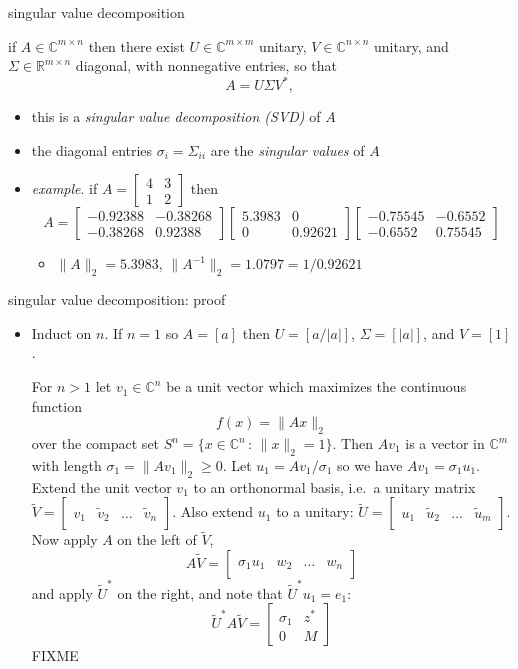 \documentclass[10pt,hyperref]{beamer}
\newcommand{\CC}{\mathbb{C}}
\newcommand{\RR}{\mathbb{R}}
\newcommand{\ds}{\displaystyle}
\newcommand{\trefmatrixthree}[3]{\left[\begin{array}{c|c|c|c} & & & \\ #1 & #2 & \dots & #3 \\ & & & \end{array}\right]}
\newcommand{\blocktwo}[4]{\left[\begin{array}{c|c} #1 & #2 \\ \hline #3 & #4 \end{array}\right]}
\begin{document}
\begin{frame}{singular value decomposition}

\begin{theorem}
 if $A\in \CC^{m\times n}$ then there exist $U\in \CC^{m\times m}$ unitary, $V \in \CC^{n\times n}$ unitary, and $\Sigma \in \RR^{m\times n}$ diagonal, with nonnegative entries, so that
    $$A = U \Sigma V^*,$$
\end{theorem}

\begin{itemize}
\item this is a \emph{singular value decomposition (SVD)} of $A$
\item the diagonal entries $\sigma_i = \Sigma_{ii}$ are the \emph{singular values} of $A$

\medskip
\item \emph{example}. if $\ds A = \begin{bmatrix} 4 & 3 \\ 1 & 2 \end{bmatrix}$ then
    $$A =
\begin{bmatrix}    -0.92388  &  -0.38268 \\  -0.38268   &  0.92388 \end{bmatrix}
\begin{bmatrix}      5.3983  &   0 \\   0 &  0.92621  \end{bmatrix}
\begin{bmatrix}    -0.75545  & -0.6552 \\  -0.6552 & 0.75545 \end{bmatrix}$$
    \begin{itemize}
    \item[$\circ$] $\|A\|_2 = 5.3983$, $\|A^{-1}\|_2 = 1.0797 = 1/0.92621$
    \end{itemize}
\end{itemize}
\end{frame}


\begin{frame}{singular value decomposition: proof}

\begin{itemize}
\footnotesize
\item[\emph{proof.}] Induct on $n$.  If $n=1$ so $A=[a]$ then $U=[a/|a|]$, $\Sigma=[|a|]$, and $V=[1]$.

For $n>1$ let $v_1 \in \CC^n$ be a unit vector which maximizes the continuous function
	$$f(x) = \|A x\|_2$$
over the compact set $S^n = \{x\in\CC^n\,:\,\|x\|_2=1\}$.  Then $Av_1$ is a vector in $\CC^m$ with length $\sigma_1=\|Av_1\|_2\ge 0$.  Let $u_1=Av_1/\sigma_1$ so we have $Av_1=\sigma_1 u_1$.  Extend the unit vector $v_1$ to an orthonormal basis, i.e.~a unitary matrix $\tilde V = \trefmatrixthree{v_1}{\tilde v_2}{\tilde v_n}$.  Also extend $u_1$ to a unitary: $\tilde U = \trefmatrixthree{u_1}{\tilde u_2}{\tilde u_m}$.  Now apply $A$ on the left of $\tilde V$,
    $$A\tilde V = \trefmatrixthree{\sigma_1 u_1}{w_2}{w_n}$$
and apply $\tilde U^*$ on the right, and note that $\tilde U^* u_1 = e_1$:
    $$\tilde U^*A\tilde V = \blocktwo{\sigma_1}{z^*}{0}{M}$$
FIXME
\normalsize
\end{itemize}
\end{frame}
\end{document}
